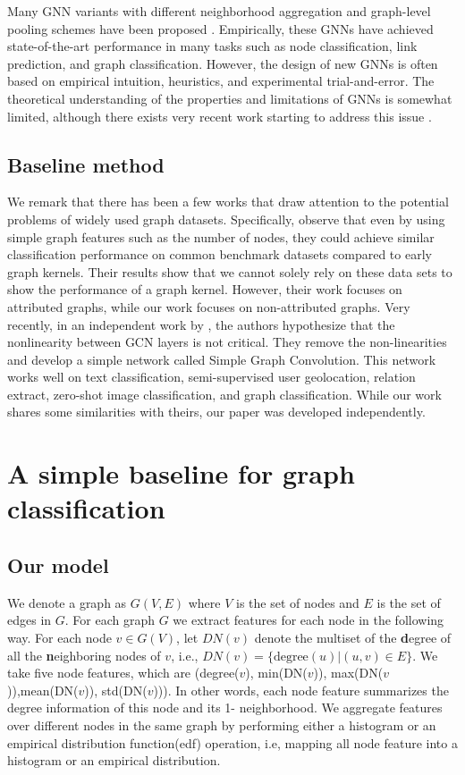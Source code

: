 \documentclass[11pt,onecolumn]{article}
\begin{document}
Many GNN variants with different neighborhood aggregation and graph-level pooling schemes have been proposed \cite{defferrard2016convolutional, duvenaud2015convolutional, hamilton2017inductive, li2015gated, kearnes2016molecular, kipf2016semi, velickovic2017graph, ying2018hierarchical}. 
Empirically, these GNNs have achieved state-of-the-art performance in many tasks such as node classification, link prediction, and graph classification. However, the design of new GNNs is often based on empirical intuition, heuristics, and experimental trial-and-error. The theoretical understanding of the properties and limitations of GNNs is somewhat limited, although there exists very recent work starting to address this issue \cite{xu2018powerful}. 

\subsection{Baseline method}
We remark that there has been a few works that draw attention to the potential problems of widely used graph datasets. Specifically, \cite{yuliia2015graph} observe that even by using simple graph features such as the number of nodes, they could achieve similar classification performance on common benchmark datasets compared to early graph kernels.  Their results show that we cannot solely rely on these data sets to show the performance of a graph kernel. However, their work focuses on attributed graphs, while our work focuses on non-attributed graphs. Very recently, in an independent work by \cite{wu2019simplifying}, the authors hypothesize that the nonlinearity between GCN layers is not critical. They remove the non-linearities and develop a simple network called Simple Graph Convolution. This network works well on text classification, semi-supervised user geolocation, relation extract, zero-shot image classification, and graph classification. While our work shares some similarities with theirs, our paper was developed independently. 

\section{A simple baseline for graph classification}
\subsection{Our model}
We denote a graph as $G(V, E)$ where $V$ is the set of nodes and $E$ is the set of edges in $G$. For each graph $G$ we extract features for each node in the following way. For each node $v \in G(V)$, let $DN(v)$ denote the multiset of the \textbf{d}egree of all the \textbf{n}eighboring nodes of $v$, i.e., $DN(v) = \{\text{degree}(u) | (u, v) \in E \}$. We take five node features, which are (degree($v$), min(DN($v$)), max(DN($v$)),mean(DN($v$)), std(DN($v$))). In other words, each node feature summarizes the degree information of this node and its 1- neighborhood. We aggregate features over different nodes in the same graph by performing either a histogram or an empirical distribution function(edf) operation, i.e, mapping all node feature into a histogram or an empirical distribution. 
\end{document}
